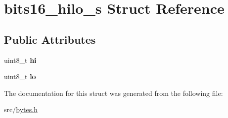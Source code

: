 \hypertarget{structbits16__hilo__s}{}\section{bits16\+\_\+hilo\+\_\+s Struct Reference}
\label{structbits16__hilo__s}
\subsection*{Public Attributes}
\begin{DoxyCompactItemize}
\item 
\hypertarget{structbits16__hilo__s_a98071eaa0aa7ced793222f30fa7955e4}{}\label{structbits16__hilo__s_a98071eaa0aa7ced793222f30fa7955e4} 
uint8\+\_\+t {\bfseries hi}
\item 
\hypertarget{structbits16__hilo__s_ab3f69ba4a390e1db439cf56708ecc799}{}\label{structbits16__hilo__s_ab3f69ba4a390e1db439cf56708ecc799} 
uint8\+\_\+t {\bfseries lo}
\end{DoxyCompactItemize}


The documentation for this struct was generated from the following file\+:\begin{DoxyCompactItemize}
\item 
src/\hyperlink{bytes_8h}{bytes.\+h}\end{DoxyCompactItemize}

